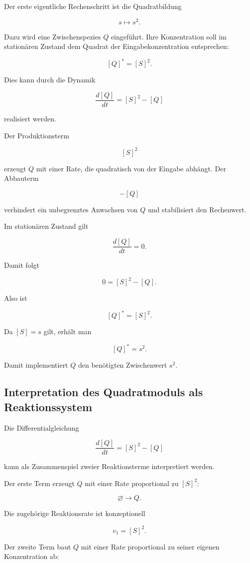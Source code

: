 Der erste eigentliche Rechenschritt ist die Quadratbildung

\[
s \mapsto s^2.
\]

Dazu wird eine Zwischenspezies \(Q\) eingeführt. Ihre Konzentration soll im
stationären Zustand dem Quadrat der Eingabekonzentration entsprechen:

\[
[Q]^*=[S]^2.
\]

Dies kann durch die Dynamik

\[
\frac{d[Q]}{dt}
=
[S]^2-[Q]
\]

realisiert werden.

Der Produktionsterm

\[
[S]^2
\]

erzeugt \(Q\) mit einer Rate, die quadratisch von der Eingabe abhängt. Der
Abbauterm

\[
-[Q]
\]

verhindert ein unbegrenztes Anwachsen von \(Q\) und stabilisiert den
Rechenwert.

Im stationären Zustand gilt

\[
\frac{d[Q]}{dt}=0.
\]

Damit folgt

\[
0=[S]^2-[Q].
\]

Also ist

\[
[Q]^*=[S]^2.
\]

Da \([S]=s\) gilt, erhält man

\[
[Q]^*=s^2.
\]

Damit implementiert \(Q\) den benötigten Zwischenwert \(s^2\).

\subsection{Interpretation des Quadratmoduls als Reaktionssystem}

Die Differentialgleichung

\[
\frac{d[Q]}{dt}
=
[S]^2-[Q]
\]

kann als Zusammenspiel zweier Reaktionsterme interpretiert werden.

Der erste Term erzeugt \(Q\) mit einer Rate proportional zu \([S]^2\):

\[
\varnothing \longrightarrow Q.
\]

Die zugehörige Reaktionsrate ist konzeptionell

\[
v_1=[S]^2.
\]

Der zweite Term baut \(Q\) mit einer Rate proportional zu seiner eigenen
Konzentration ab:

